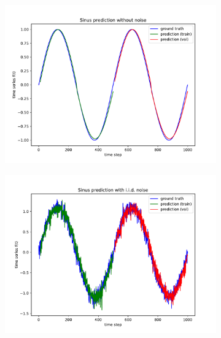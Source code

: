 \documentclass{article}
\begin{document}
\begin{figure}
  \begin{subfigure}{.35\textwidth}
    \centering
    \includegraphics[width=\linewidth]{figures/plot_twolayer_noiseless.pdf}
  \end{subfigure}
  \hspace{-5mm}
  \begin{subfigure}{.35\textwidth}
    \centering
    \includegraphics[width=\linewidth]{figures/plot_twolayer_iidnoise.pdf}
  \end{subfigure}
  \hspace{-5mm}
  \begin{subfigure}{.35\textwidth}
    \centering

\end{subfigure}
\end{figure}
\end{document}
